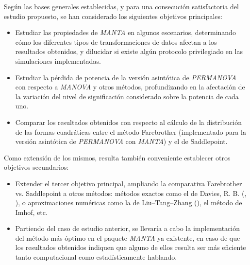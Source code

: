 \documentclass[IB,BIB]{TFUOC}%
\begin{document}
Según las bases generales establecidas, y para una consecución satisfactoria del estudio propuesto, se han considerado los siguientes objetivos principales:

{\small
\begin{itemize}
    \item Estudiar las propiedades de \textit{MANTA} en algunos escenarios, determinando cómo los diferentes tipos de transformaciones de datos afectan a los resultados obtenidos, y dilucidar si existe algún protocolo privilegiado en las simulaciones implementadas.
    \item Estudiar la pérdida de potencia de la versión asintótica de \textit{PERMANOVA} con respecto a \textit{MANOVA} y otros métodos, profundizando en la afectación de la variación del nivel de significación considerado sobre la potencia de cada uno.
    \item Comparar los resultados obtenidos con respecto al cálculo de la distribución de las formas cuadráticas entre el método Farebrother (implementado para la versión asintótica de \textit{PERMANOVA} con \textit{MANTA}) y el de Saddlepoint.
\end{itemize}}

Como extensión de los mismos, resulta también conveniente establecer otros objetivos secundarios:

{\small
\begin{itemize}
    \item Extender el tercer objetivo principal, ampliando la comparativa Farebrother vs. Saddlepoint a otros métodos: métodos exactos como el de Davies, R. B. (\cite{davies_numerical_1973}, \cite{davies_algorithm_1980}), o aproximaciones numéricas como la de Liu–Tang–Zhang (\cite{qi_genetic_2022}), el método de Imhof, etc.
    \item Partiendo del caso de estudio anterior, se llevaría a cabo la implementación del método más óptimo en el paquete \textit{MANTA} ya existente, en caso de que los resultados obtenidos indiquen que alguno de ellos resulta ser más eficiente tanto computacional como estadísticamente hablando.
\end{itemize}}


% 
% 
\end{document}
